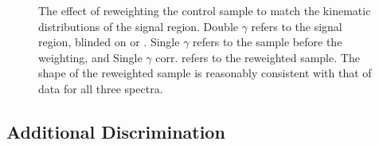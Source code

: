 \begin{figure}[ht]
\begin{center}
 \end{center}
\caption{The effect of reweighting the \gjjj control sample to match the kinematic distributions of the
signal region. Double $\gamma$ refers to the signal region, blinded on \Mgg or \Mjj. Single $\gamma$
refers to the \gjjj sample before the weighting, and Single $\gamma$ corr. refers to the reweighted
\gjjj sample. The shape of the reweighted \gjjj sample is reasonably consistent with that of data
for all three spectra.}
\label{fig:datacs}
\end{figure}

\subsection{Additional Discrimination\label{subsec:add_discrimination}}


